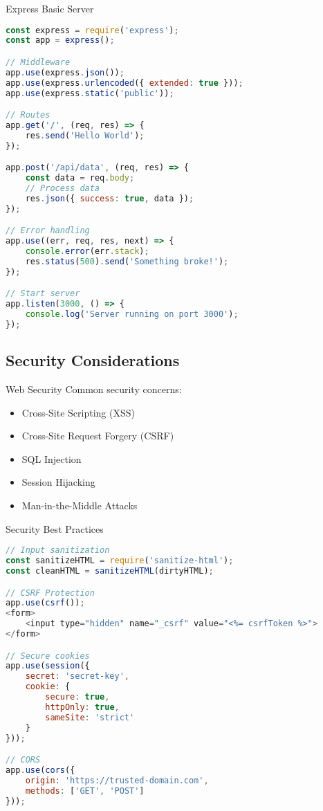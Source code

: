 \begin{KR}{Express Basic Server}
\begin{lstlisting}[language=JavaScript, style=basesmol]
const express = require('express');
const app = express();

// Middleware
app.use(express.json());
app.use(express.urlencoded({ extended: true }));
app.use(express.static('public'));

// Routes
app.get('/', (req, res) => {
    res.send('Hello World');
});

app.post('/api/data', (req, res) => {
    const data = req.body;
    // Process data
    res.json({ success: true, data });
});

// Error handling
app.use((err, req, res, next) => {
    console.error(err.stack);
    res.status(500).send('Something broke!');
});

// Start server
app.listen(3000, () => {
    console.log('Server running on port 3000');
});
\end{lstlisting}
\end{KR}

\subsection{Security Considerations}

\begin{concept}{Web Security}
    Common security concerns:
    \begin{itemize}
        \item Cross-Site Scripting (XSS)
        \item Cross-Site Request Forgery (CSRF)
        \item SQL Injection
        \item Session Hijacking
        \item Man-in-the-Middle Attacks
    \end{itemize}
\end{concept}

\begin{KR}{Security Best Practices}
\begin{lstlisting}[language=JavaScript, style=basesmol]
// Input sanitization
const sanitizeHTML = require('sanitize-html');
const cleanHTML = sanitizeHTML(dirtyHTML);

// CSRF Protection
app.use(csrf());
<form>
    <input type="hidden" name="_csrf" value="<%= csrfToken %>">
</form>

// Secure cookies
app.use(session({
    secret: 'secret-key',
    cookie: {
        secure: true,
        httpOnly: true,
        sameSite: 'strict'
    }
}));

// CORS
app.use(cors({
    origin: 'https://trusted-domain.com',
    methods: ['GET', 'POST']
}));
\end{lstlisting}
\end{KR}